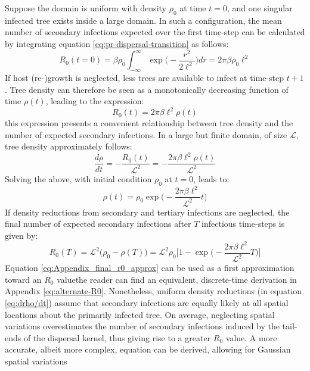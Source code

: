 Suppose the domain is uniform with density $\rho_0$ at time $t=0$, and one singular infected tree exists inside a large domain.
In such a configuration, the mean number of secondary infections expected over the first time-step can be calculated by integrating equation \ref{eq:pr-dispersal-transition} as follows:
\begin{equation}
    R_0(t = 0) = \beta \rho_0 \int^{\infty}_{-\infty} \exp\Big(-\frac{r^2}{2\ell^2}\Big)dr= 2\pi\beta\rho_0\ell^2
\end{equation}
If host (re-)growth is neglected, less trees are available to infect at time-step $t+1$. 
Tree density can therefore be seen as a monotonically decreasing function of time $\rho(t)$, leading to the expression:
\begin{equation}
    R_0(t) = 2\pi\beta\ell^2\rho(t)
    \label{eq:r0-A}
\end{equation}
this expression presents a convenient relationship between tree density and the number of expected secondary infections. 
In a large but finite domain, of size $\mathcal{L}$, tree density approximately follows:
\begin{equation}
\label{eq:drho/dt}
    \frac{d\rho}{dt} = - \frac{R_0(t)}{\mathcal{L}^2} = -\frac{2\pi\beta\ell^2\rho(t)}{\mathcal{L}^2}
\end{equation}
Solving the above, with initial condition $\rho_0$ at $t=0$, leads to:
\begin{equation}
\label{eq:rho(t)-linear}
    \rho(t) = \rho_0 \exp\Big(-\frac{2\pi\beta\ell^2}{\mathcal{L}^2} t \Big)
\end{equation}
If density reductions from secondary and tertiary infections are neglected, the final number of expected secondary infections after $T$ infectious time-steps is given by:
\begin{equation}
\label{eq:Appendix_final_r0_approx}
    R_0(T) =  \mathcal{L}^2\big(\rho_0 - \rho(T)\big) = \mathcal{L}^2\rho_0\Big[1 - \exp\big(-\frac{2\pi\beta\ell^2}{\mathcal{L}^2} T \big) \Big]
\end{equation}
Equation \ref{eq:Appendix_final_r0_approx} can be used as a first approximation toward an $R_0$ value\textemdash the reader can find an equivalent, discrete-time derivation in Appendix \ref{eq:alternate-R0}.
Nonetheless, uniform density reductions (in equation \ref{eq:drho/dt}) assume that secondary infections are equally likely at all spatial locations about the primarily infected tree. 
On average, neglecting spatial variations overestimates the number of secondary infections induced by the tail-ends of the dispersal kernel,
thus giving rise to a greater $R_0$ value.
A more accurate, albeit more complex, equation can be derived, allowing for Gaussian spatial variations

